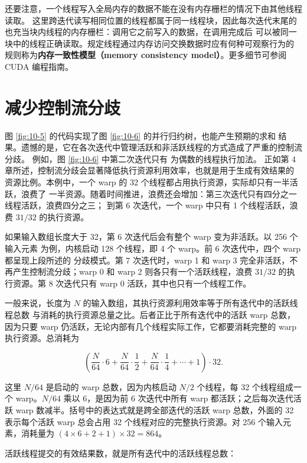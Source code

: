 还要注意，一个线程写入全局内存的数据不能在没有内存栅栏的情况下由其他线程读取。
这里跨迭代读写相同位置的线程都属于同一线程块，因此每次迭代末尾的
 也充当块内线程的内存栅栏：调用它之前写入的数据，在调用完成后
可以被同一块中的线程正确读取。规定线程通过内存访问交换数据时应有何种可观察行为的
规则称为\textbf{内存一致性模型（memory consistency model）}。更多细节可参阅 CUDA
编程指南。

\section{减少控制流分歧}
\label{sec:reduction-control-divergence}

图 \ref{fig:10-5} 的代码实现了图 \ref{fig:10-6} 的并行归约树，也能产生预期的求和
结果。遗憾的是，它在各次迭代中管理活跃和非活跃线程的方式造成了严重的控制流分歧。
例如，图 \ref{fig:10-6} 中第二次迭代只有  为偶数的线程执行加法。
正如第 4 章所述，控制流分歧会显著降低执行资源利用效率，也就是用于生成有效结果的
资源比例。本例中，一个 warp 的 32 个线程都占用执行资源，实际却只有一半活跃，浪费了
一半资源。随着时间推进，浪费还会增加：第三次迭代只有四分之一线程活跃，浪费四分之三；
到第 6 次迭代，一个 warp 中只有 1 个线程活跃，浪费 $31/32$ 的执行资源。

如果输入数组长度大于 32，第 6 次迭代后会有整个 warp 变为非活跃。以 256 个输入元素
为例，内核启动 128 个线程，即 4 个 warp。前 6 次迭代中，四个 warp 都呈现上段所述的
分歧模式。第 7 次迭代时，warp 1 和 warp 3 完全非活跃，不再产生控制流分歧；warp 0
和 warp 2 则各只有一个活跃线程，浪费 $31/32$ 的执行资源。第 8 次迭代只有 warp 0
活跃，其中也只有一个线程工作。

一般来说，长度为 $N$ 的输入数组，其执行资源利用效率等于所有迭代中的活跃线程总数
与消耗的执行资源总量之比。后者正比于所有迭代中的活跃 warp 总数，因为只要 warp
仍活跃，无论内部有几个线程实际工作，它都要消耗完整的 warp 执行资源。总消耗为

\[
  \left(\frac{N}{64}\cdot 6+
  \frac{N}{64}\cdot\frac12+
  \frac{N}{64}\cdot\frac14+\cdots+1\right)\cdot 32.
\]

这里 $N/64$ 是启动的 warp 总数，因为内核启动 $N/2$ 个线程，每 32 个线程组成一个
warp。$N/64$ 乘以 6，是因为前 6 次迭代中所有 warp 都活跃；之后每次迭代活跃 warp
数减半。括号中的表达式就是跨全部迭代的活跃 warp 总数，外面的 32 表示每个活跃 warp
总会占用 32 个线程对应的完整执行资源。对 256 个输入元素，消耗量为
$(4\times6+2+1)\times32=864$。

活跃线程提交的有效结果数，就是所有迭代中的活跃线程总数：

